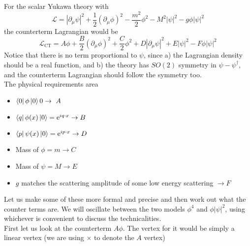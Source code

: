 \documentclass[11pt, notitlepage]{report}
\newcommand{\del}{\partial}
\newcommand{\e}{\mathrm{e}}
\newcommand{\ld}{\mathcal{L}}
\numberwithin{equation}{section}
\begin{document}
For the scalar Yukawa theory with 
\begin{equation*}
    \ld = |\del_\mu \psi|^2 + \frac{1}{2}(\del_\mu \phi)^2 - \frac{m^2}{2}\phi^2 - M^2|\psi|^2 - g\phi|\psi|^2
\end{equation*}
the counterterm Lagrangian would be 
\begin{equation*}
    \ld_{\text{CT}} = A\phi + \frac{B}{2}(\del_\mu \phi)^2 + \frac{C}{2}\phi^2 + D|\del_\mu \psi|^2  + E|\psi|^2 - F\phi|\psi|^2
\end{equation*}
Notice that there is no term proportional to \(\psi\), since a) the Lagrangian density should be a real function, and b) the theory has \(SO(2)\) symmetry in \(\psi-\psi^\dagger\), and the counterterm Lagrangian should follow the symmetry too.\\
The physical requirements area
\begin{itemize}
    \item \(\bra{0}\phi\ket{0} 0 \to~A\)
    \item \(\bra{q}\phi(x)\ket{0} = \e^{iq\cdot x} \to B\)
    \item \(\bra{p}\psi(x)\ket{0} = \e^{ip\cdot x} \to D\)
    \item Mass of \(\phi = m \to C\)
    \item Mass of \(\psi = M \to E\)
    \item \(g\) matches the scattering amplitude of some low energy scattering \(\to F\) 
\end{itemize}

Let us make some of these more formal and precise and then work out what the counter terms are. We will oscillate between the two models \(\phi^4\) and \(\phi|\psi|^2\), using whichever is convenient to discuss the technicalities. \\

First let us look at the counterterm \(A\phi\). The vertex for it would be simply a linear vertex (we are using \(\times\) to denote the \(A\) vertex)
\begin{figure}[h]
    \centering
\end{figure}
\end{document}

